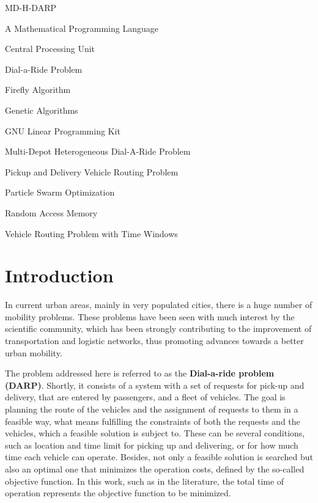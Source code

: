 \documentclass[tuberlin,cic,tc,openright,english,noabntcite,oneside]{iiufrgs}
\begin{document}
\begin{listofabbrv}{MD-H-DARP}
	\item[AMPL] A Mathematical Programming Language
	\item[CPU] Central Processing Unit
    \item[DARP] Dial-a-Ride Problem
    \item[FA] Firefly Algorithm
    \item[GA] Genetic Algorithms
    \item[GLPK] GNU Linear Programming Kit
    \item[MD-H-DARP] Multi-Depot Heterogeneous Dial-A-Ride Problem
    \item[PDVRP] Pickup and Delivery Vehicle Routing Problem
    \item[PSO] Particle Swarm Optimization
    \item[RAM] Random Access Memory
    \item[VRPTW] Vehicle Routing Problem with Time Windows
\end{listofabbrv}


\tableofcontents


\chapter{Introduction}
In current urban areas, mainly in very populated cities, there is a huge number of mobility problems. These problems have been seen with much interest by the scientific community, which has been strongly contributing to the improvement of transportation and logistic networks, thus promoting advances towards a better urban mobility.

The problem addressed here is referred to as the \textbf{Dial-a-ride problem (DARP)}. Shortly, it consists of a system with a set of requests for pick-up and delivery, that are entered by passengers, and a fleet of vehicles. The goal is planning the route of the vehicles and the assignment of requests to them in a feasible way, what means fulfilling the constraints of both the requests and the vehicles, which a feasible solution is subject to. These can be several conditions, such as location and time limit for picking up and delivering, or for how much time each vehicle can operate. Besides, not only a feasible solution is searched but also an optimal one that minimizes the operation costs, defined by the so-called objective function. In this work, such as in the literature, the total time of operation represents the objective function to be minimized.
\end{document}
